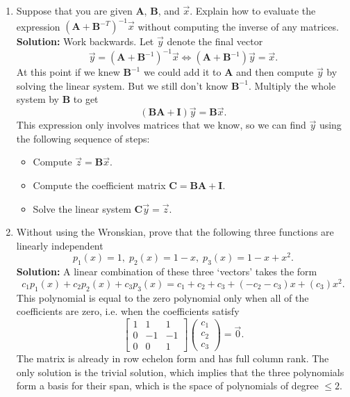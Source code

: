 \documentclass[11pt,fleqn]{article}
\newcommand{\mat}[1]{\mathbf{#1}}
\begin{document}
\begin{enumerate}
\item Suppose that you are given $\mat{A}$, $\mat{B}$, and $\vec{x}$. Explain how to evaluate the expression $(\mathbf{A}+\mathbf{B}^{-T})^{-1}\vec{x}$ without computing the inverse of any matrices. {\bf Solution:} Work backwards. Let $\vec{y}$ denote the final vector
\[\vec{y} = (\mathbf{A}+\mathbf{B}^{-1})^{-1}\vec{x}\Leftrightarrow (\mathbf{A}+\mathbf{B}^{-1})\vec{y} = \vec{x}.\]
At this point if we knew $\mathbf{B}^{-1}$ we could add it to $\mathbf{A}$ and then compute $\vec{y}$ by solving the linear system.
But we still don't know $\mathbf{B}^{-1}$.
Multiply the whole system by $\mathbf{B}$ to get
\[\left(\mathbf{B}\mathbf{A}+\mathbf{I}\right)\vec{y} = \mathbf{B}\vec{x}.\]
This expression only involves matrices that we know, so we can find $\vec{y}$ using the following sequence of steps:
\begin{itemize}
\item Compute $\vec{z} = \mathbf{B}\vec{x}$.
\item Compute the coefficient matrix $\mathbf{C} = \mathbf{B}\mathbf{A}+\mathbf{I}$.
\item Solve the linear system $\mathbf{C}\vec{y} = \vec{z}$.
\end{itemize}
\item Without using the Wronskian, prove that the following three functions are linearly independent
\[p_1(x) = 1,\;p_2(x) = 1 - x,\;p_3(x) = 1 - x + x^2.\]
{\bf Solution:} A linear combination of these three `vectors' takes the form
\[c_1p_1(x) + c_2p_2(x) + c_3p_3(x) = c_1+c_2+c_3 + (-c_2-c_3)x + (c_3)x^2.\]
This polynomial is equal to the zero polynomial only when all of the coefficients are zero, i.e. when the coefficients satisfy
\[\left[\begin{array}{ccc}1&1&1\\0&-1&-1\\0&0&1\end{array}\right]\left(\begin{array}{c}c_1\\c_2\\c_3\end{array}\right) = \vec{0}.\]
The matrix is already in row echelon form and has full column rank.
The only solution is the trivial solution, which implies that the three polynomials form a basis for their span, which is the space of polynomials of degree $\le 2$.\\


\end{enumerate}
\end{document}
